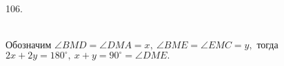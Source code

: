 106. \begin{figure}[ht!]
\end{figure}\\
Обозначим $\angle BMD=\angle DMA=x,\ \angle BME=\angle EMC=y,$ тогда $2x+2y=180^\circ,\ x+y=90^\circ=\angle DME.$\\

